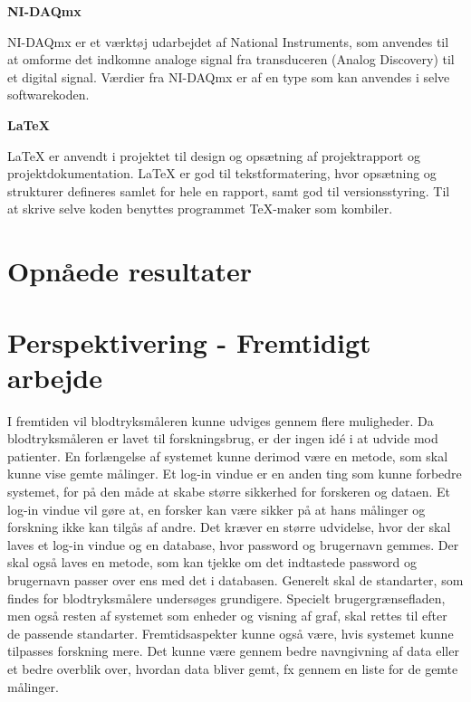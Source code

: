 \textbf{NI-DAQmx}

NI-DAQmx er et værktøj udarbejdet af National Instruments, som anvendes til at omforme det indkomne analoge signal fra transduceren (Analog Discovery) til et digital signal. Værdier fra NI-DAQmx er af en type som kan anvendes i selve softwarekoden. 

\textbf{LaTeX}

LaTeX er anvendt i projektet til design og opsætning af projektrapport og projektdokumentation. LaTeX er god til tekstformatering, hvor opsætning og strukturer defineres samlet for hele en rapport, samt god til versionsstyring. Til at skrive selve koden benyttes programmet TeX-maker som kombiler. 

\section{Opnåede resultater}
\section{Perspektivering - Fremtidigt arbejde}
I fremtiden vil blodtryksmåleren kunne udviges gennem flere muligheder. Da blodtryksmåleren er lavet til forskningsbrug, er der ingen idé i at udvide mod patienter.  En forlængelse af systemet kunne derimod være en metode, som skal kunne vise gemte målinger. \newline Et log-in vindue er en anden ting som kunne forbedre systemet, for på den måde at skabe større sikkerhed for forskeren og dataen. Et log-in vindue vil gøre at, en forsker kan være sikker på at hans målinger og forskning ikke kan tilgås af andre. Det kræver en større udvidelse, hvor der skal laves et log-in vindue og en database, hvor password og brugernavn gemmes. Der skal også laves en metode, som kan tjekke om det indtastede password og brugernavn passer over ens med det i databasen. 
\newline
Generelt skal de standarter, som findes for blodtryksmålere undersøges grundigere. Specielt brugergrænsefladen, men også resten af systemet som enheder og visning af graf, skal rettes til efter de passende standarter.
\newline 
Fremtidsaspekter kunne også være, hvis systemet kunne tilpasses forskning mere.  Det kunne være gennem bedre navngivning af data eller et bedre overblik over, hvordan data bliver gemt, fx gennem en liste for de gemte målinger.   